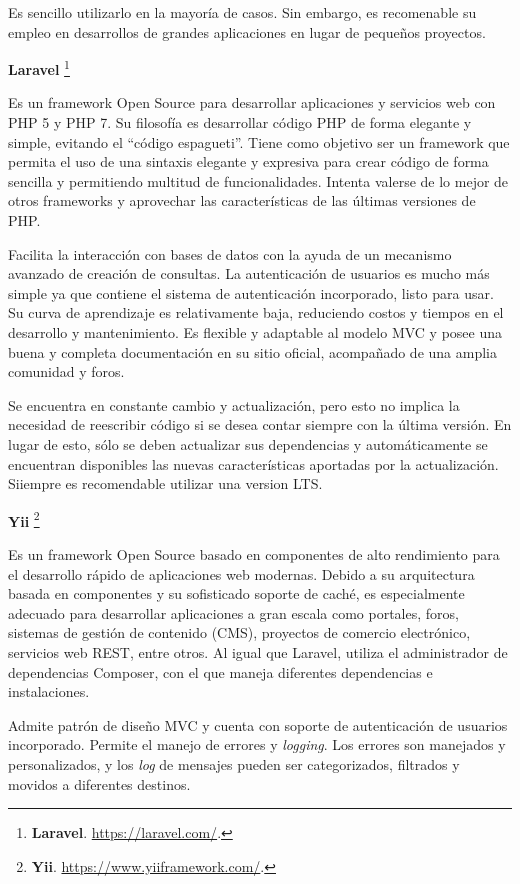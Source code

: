 \documentclass[11pt,oneside]{book}
\begin{document}
Es sencillo utilizarlo en la mayoría de casos. Sin embargo, es recomenable su empleo en desarrollos de grandes aplicaciones en lugar de pequeños proyectos.

\textbf{Laravel} \footnote{\textbf{Laravel}. \url{https://laravel.com/}.}

Es un framework Open Source para desarrollar aplicaciones y servicios web con PHP 5 y PHP 7. Su filosofía es desarrollar código PHP de forma elegante y simple, evitando el ``código espagueti''. Tiene como objetivo ser un framework que permita el uso de una sintaxis elegante y expresiva para crear código de forma sencilla y permitiendo multitud de funcionalidades. Intenta valerse de lo mejor de otros frameworks y aprovechar las características de las últimas versiones de PHP.

Facilita la interacción con bases de datos con la ayuda de un mecanismo avanzado de creación de consultas. La autenticación de usuarios es mucho más simple ya que contiene el sistema de autenticación incorporado, listo para usar. Su curva de aprendizaje es relativamente baja, reduciendo costos y tiempos en el desarrollo y mantenimiento. Es flexible y adaptable al modelo MVC y posee una buena y completa documentación en su sitio oficial, acompañado de una amplia comunidad y foros.

Se encuentra en constante cambio y actualización, pero esto no implica la necesidad de reescribir código si se desea contar siempre con la última versión. En lugar de esto, sólo se deben actualizar sus dependencias y automáticamente se encuentran disponibles las nuevas características aportadas por la actualización. Siiempre es recomendable utilizar una version LTS.

\newpage
\textbf{Yii} \footnote{\textbf{Yii}. \url{https://www.yiiframework.com/}.}

Es un framework Open Source basado en componentes de alto rendimiento para el desarrollo rápido de aplicaciones web modernas. Debido a su arquitectura basada en componentes y su sofisticado soporte de caché, es especialmente adecuado para desarrollar aplicaciones a gran escala como portales, foros, sistemas de gestión de contenido (CMS), proyectos de comercio electrónico, servicios web REST, entre otros. Al igual que Laravel, utiliza el administrador de dependencias Composer, con el que maneja diferentes dependencias e instalaciones.

Admite patrón de diseño MVC y cuenta con soporte de autenticación de usuarios incorporado. Permite el manejo de errores y \textit{logging}. Los errores son manejados y personalizados, y los \textit{log} de mensajes pueden ser categorizados, filtrados y movidos a diferentes destinos.
\end{document}
